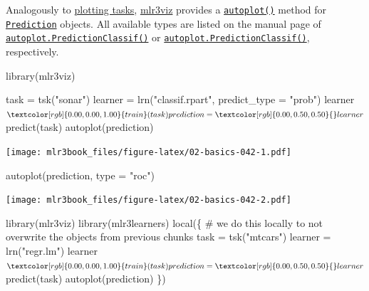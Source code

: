 \documentclass[]{article}
\newenvironment{Shaded}{}{}
\newcommand{\CommentTok}[1]{\textcolor[rgb]{0.00,0.50,0.00}{#1}}
\newcommand{\DataTypeTok}[1]{#1}
\newcommand{\KeywordTok}[1]{\textcolor[rgb]{0.00,0.00,1.00}{#1}}
\newcommand{\NormalTok}[1]{#1}
\newcommand{\OperatorTok}[1]{#1}
\newcommand{\StringTok}[1]{\textcolor[rgb]{0.00,0.50,0.50}{#1}}
\renewenvironment{Shaded} {\begin{snugshade}\small} {\end{snugshade}}
\begin{document}
Analogously to \protect\hyperlink{autoplot-task}{plotting tasks}, \href{https://mlr3viz.mlr-org.com}{mlr3viz} provides a \href{https://www.rdocumentation.org/packages/ggplot2/topics/autoplot}{\texttt{autoplot()}} method for \href{https://mlr3.mlr-org.com/reference/Prediction.html}{\texttt{Prediction}} objects.
All available types are listed on the manual page of \href{https://mlr3viz.mlr-org.com/reference/autoplot.PredictionClassif.html}{\texttt{autoplot.PredictionClassif()}} or \href{https://mlr3viz.mlr-org.com/reference/autoplot.PredictionClassif.html}{\texttt{autoplot.PredictionClassif()}}, respectively.

\begin{Shaded}
\begin{Highlighting}[]
\KeywordTok{library}\NormalTok{(mlr3viz)}

\NormalTok{task =}\StringTok{ }\KeywordTok{tsk}\NormalTok{(}\StringTok{"sonar"}\NormalTok{)}
\NormalTok{learner =}\StringTok{ }\KeywordTok{lrn}\NormalTok{(}\StringTok{"classif.rpart"}\NormalTok{, }\DataTypeTok{predict_type =} \StringTok{"prob"}\NormalTok{)}
\NormalTok{learner}\OperatorTok{$}\KeywordTok{train}\NormalTok{(task)}
\NormalTok{prediction =}\StringTok{ }\NormalTok{learner}\OperatorTok{$}\KeywordTok{predict}\NormalTok{(task)}
\KeywordTok{autoplot}\NormalTok{(prediction)}
\end{Highlighting}
\end{Shaded}

\texttt{[image: mlr3book\_files/figure-latex/02-basics-042-1.pdf]}

\begin{Shaded}
\begin{Highlighting}[]
\KeywordTok{autoplot}\NormalTok{(prediction, }\DataTypeTok{type =} \StringTok{"roc"}\NormalTok{)}
\end{Highlighting}
\end{Shaded}

\texttt{[image: mlr3book\_files/figure-latex/02-basics-042-2.pdf]}

\begin{Shaded}
\begin{Highlighting}[]
\KeywordTok{library}\NormalTok{(mlr3viz)}
\KeywordTok{library}\NormalTok{(mlr3learners)}
\KeywordTok{local}\NormalTok{(\{ }\CommentTok{# we do this locally to not overwrite the objects from previous chunks}
\NormalTok{    task =}\StringTok{ }\KeywordTok{tsk}\NormalTok{(}\StringTok{"mtcars"}\NormalTok{)}
\NormalTok{    learner =}\StringTok{ }\KeywordTok{lrn}\NormalTok{(}\StringTok{"regr.lm"}\NormalTok{)}
\NormalTok{    learner}\OperatorTok{$}\KeywordTok{train}\NormalTok{(task)}
\NormalTok{    prediction =}\StringTok{ }\NormalTok{learner}\OperatorTok{$}\KeywordTok{predict}\NormalTok{(task)}
    \KeywordTok{autoplot}\NormalTok{(prediction)}
\NormalTok{\})}
\end{Highlighting}
\end{Shaded}
\end{document}
